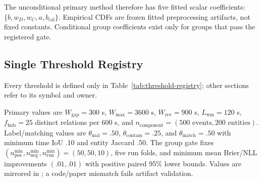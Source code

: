The unconditional primary method therefore has five fitted scalar coefficients:
$\{b,w_D,w_C,a,b_{\mathrm{cal}}\}$. Empirical CDFs are frozen fitted preprocessing artifacts,
not fixed constants. Conditional group coefficients exist only for groups that pass the
registered gate.

\subsection{Single Threshold Registry}

Every threshold is defined only in Table~\ref{tab:threshold-registry}; other sections refer to
its symbol and owner.

Primary values are $W_{\mathrm{gap}}=300$ s, $W_{\max}=3600$ s,
$W_{\mathrm{rev}}=900$ s, $L_{\mathrm{wm}}=120$ s, $f_{\mathrm{hub}}=25$ distinct
relations per 600 s, and $n_{\mathrm{component}}=(500\text{ events},200\text{ entities})$.
Label/matching values are $\theta_{\mathrm{mal}}=.50$,
$\theta_{\mathrm{contam}}=.25$, and $\theta_{\mathrm{match}}=.50$ with minimum time IoU .10
and entity Jaccard .50. The group gate fixes
$(n_{\mathrm{pos}}^{\min},n_{\mathrm{neg}}^{\min},n_{\mathrm{run}}^{\min})=(50,50,10)$,
five run folds, and minimum mean Brier/NLL improvements $(.01,.01)$ with positive paired 95\%
lower bounds. Values are mirrored in ; a code/paper mismatch fails
artifact validation.

